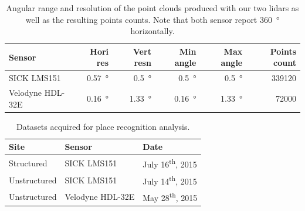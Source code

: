 \begin{table}[h]
    \centering
    \begin{tabular}{@{}lrrrrr@{}}
        \toprule
        \textbf{Sensor}  & \textbf{Hori res}  & \textbf{Vert resn} & \textbf{Min angle} & \textbf{Max angle} & \textbf{Points count}  \\
        \hline
        SICK LMS151      & \SI{0.57}{\degree} & \SI{0.5}{\degree}  & \SI{0.5}{\degree}  & \SI{0.5}{\degree}  & 339120                 \\
        Velodyne HDL-32E & \SI{0.16}{\degree} & \SI{1.33}{\degree} & \SI{0.16}{\degree} & \SI{1.33}{\degree} & 72000                  \\
        \bottomrule
    \end{tabular}
    \caption{Angular range and resolution of the point clouds produced with our two \gls{lidar}s as well as the resulting points counts. Note that both sensor report \SI{360}{\degree} horizontally.}
    \label{tab:slam_sensor_resolution}
\end{table}

\begin{table}[h]
    \centering
    \begin{tabular}{@{}lll@{}}
        \toprule
        \textbf{Site}  & \textbf{Sensor}   & \textbf{Date}                     \\
        \hline
        Structured     & SICK LMS151       & July 16\textsuperscript{th}, 2015 \\
        Unstructured   & SICK LMS151       & July 14\textsuperscript{th}, 2015 \\
        Unstructured   & Velodyne HDL-32E  & May 28\textsuperscript{th}, 2015  \\
        \bottomrule
    \end{tabular}
    \caption{Datasets acquired for place recognition analysis.}
    \label{tab:slam_datasets}
\end{table}

